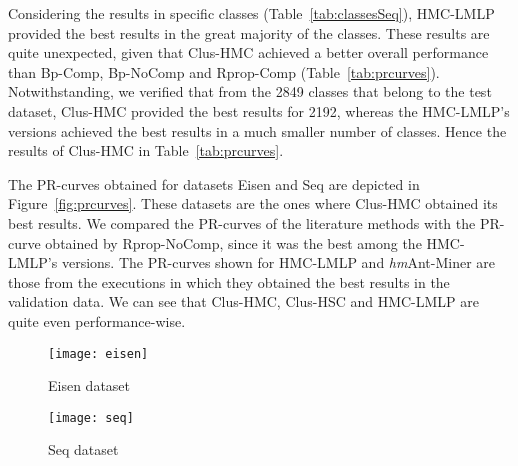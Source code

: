 Considering the results in specific classes (Table~\ref{tab:classesSeq}), HMC-LMLP provided the best results in the great majority of the classes. These results are quite unexpected, given that Clus-HMC achieved a better overall performance than Bp-Comp, Bp-NoComp and Rprop-Comp (Table~\ref{tab:prcurves}). Notwithstanding, we verified that from the 2849 classes that belong to the test dataset, Clus-HMC provided the best results for 2192, whereas the HMC-LMLP's versions achieved the best results in a much smaller number of classes. Hence the results of Clus-HMC in Table~\ref{tab:prcurves}.

The PR-curves obtained for datasets Eisen and Seq are depicted in Figure~\ref{fig:prcurves}. These datasets are the ones where Clus-HMC obtained its best results. We compared the PR-curves of the literature methods with the PR-curve obtained by Rprop-NoComp, since it was the best among the HMC-LMLP's versions. The PR-curves shown for HMC-LMLP and {\it hm}Ant-Miner are those from the executions in which they obtained the best results in the validation data. We can see that Clus-HMC, Clus-HSC and HMC-LMLP are quite even performance-wise.

\begin{figure*}[ht]
        \centering
        \begin{subfigure}[b]{0.3\textwidth}
                \centering
                \texttt{[image: eisen]}
                \caption{Eisen dataset}
                \label{fig:eisenTree}
        \end{subfigure}
		\qquad\qquad\qquad
        \begin{subfigure}[b]{0.3\textwidth}
                \centering
                \texttt{[image: seq]}
                \caption{Seq dataset}
                \label{fig:seqTree}
        \end{subfigure}
        \caption{PR-curves of Rprop-NoComp, Clus-HMC, CLus-HSC, Clus-SC, and {\it hm}Ant-Miner.}
        \label{fig:prcurves}
\end{figure*}